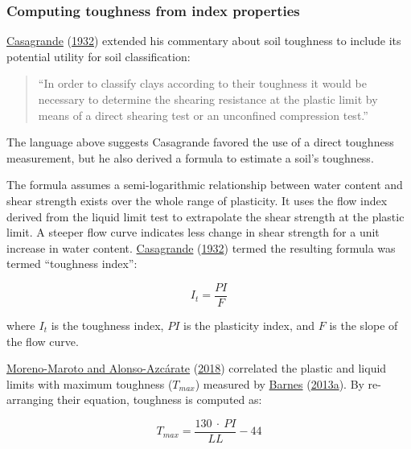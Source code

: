 \documentclass[
  letterpaper,
  openany]{book}
\renewenvironment{leftbar}{\def\FrameCommand{\color{grey30}\vrule width 1pt \hspace{10pt}}\MakeFramed {\advance\hsize-\width \FrameRestore}}{\endMakeFramed}
\renewenvironment{quote}%
{\begin{leftbar} \begin{quotation} \noindent \small }%
{\end{quotation}\end{leftbar}}
\begin{document}
\hypertarget{computing-toughness-from-index-properties}{%
\subsubsection{Computing toughness from index properties}\label{computing-toughness-from-index-properties}}

\protect\hyperlink{ref-Casagrande1932}{Casagrande} (\protect\hyperlink{ref-Casagrande1932}{1932}) extended his commentary about soil toughness to include its potential utility for soil classification:

\begin{quote}
``In order to classify clays according to their toughness it would be necessary to determine the shearing resistance at the plastic limit by means of a direct shearing test or an unconfined compression test.''
\end{quote}

The language above suggests Casagrande favored the use of a direct toughness measurement, but he also derived a formula to estimate a soil's toughness.

The formula assumes a semi-logarithmic relationship between water content and shear strength exists over the whole range of plasticity.
It uses the flow index derived from the liquid limit test to extrapolate the shear strength at the plastic limit.
A steeper flow curve indicates less change in shear strength for a unit increase in water content.
\protect\hyperlink{ref-Casagrande1932}{Casagrande} (\protect\hyperlink{ref-Casagrande1932}{1932}) termed the resulting formula was termed ``toughness index'':

\begin{equation}
I_t = \frac{PI}{F} 
\label{eq:casagrande-toughness-index}
\end{equation}

where \(I_t\) is the toughness index, \(PI\) is the plasticity index, and \(F\) is the slope of the flow curve.

\protect\hyperlink{ref-Moreno-Maroto2018}{Moreno-Maroto and Alonso-Azcárate} (\protect\hyperlink{ref-Moreno-Maroto2018}{2018}) correlated the plastic and liquid limits with maximum toughness (\(T_{max}\)) measured by \protect\hyperlink{ref-Barnes2013}{Barnes} (\protect\hyperlink{ref-Barnes2013}{2013a}).
By re-arranging their equation, toughness is computed as:

\begin{equation}
T_{max}=\frac{130~\cdot~PI}{LL}-44
\label{eq:moreno-maroto-toughness}
\end{equation}
\end{document}
